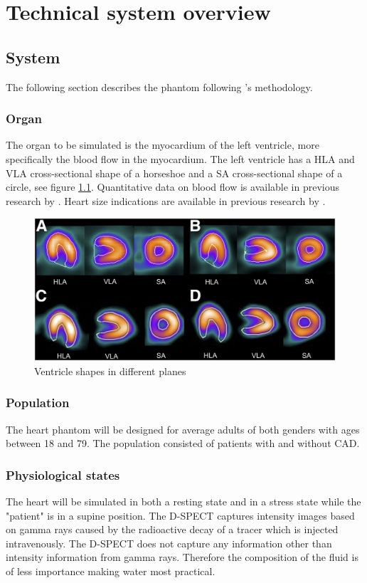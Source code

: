 \chapter{Technical system overview}
\section{System}
The following section describes the phantom following \cite{van2011modeling}'s methodology.
\subsection{Organ}
The organ to be simulated is the myocardium of the left ventricle, more specifically the blood flow in the myocardium. The left ventricle has a \ac{HLA} and \ac{VLA} cross-sectional shape of a horseshoe and a \ac{SA} cross-sectional shape of a circle, see figure \ref{fig:ventricle_shapes}. Quantitative data on blood flow is available in previous research by \cite{uren1994relation, chiribiri2013normal, ho2014dynamic, slart2015Pres}. Heart size indications are available in previous research by \cite{lin2008cardiac, maceira2006normalizedleft, maceira2006normalizedright}.

\begin{figure}[H]
	\includegraphics[scale=1]{./images/ventricle_shapes.jpg}
	\caption{Ventricle shapes in different planes\citep{yoneyama2017validation}}
	\label{fig:ventricle_shapes}
\end{figure}

\subsection{Population}
The heart phantom will be designed for average adults of both genders with ages between 18 and 79. The population consisted of patients with and without \ac{CAD}.
\subsection{Physiological states}
The heart will be simulated in both a resting state and in a stress state while the "patient" is in a supine position. The D-SPECT captures intensity images based on gamma rays caused by the radioactive decay of a tracer which is injected intravenously. The D-SPECT does not capture any information other than intensity information from gamma rays. Therefore the composition of the fluid is of less importance making water most practical.
